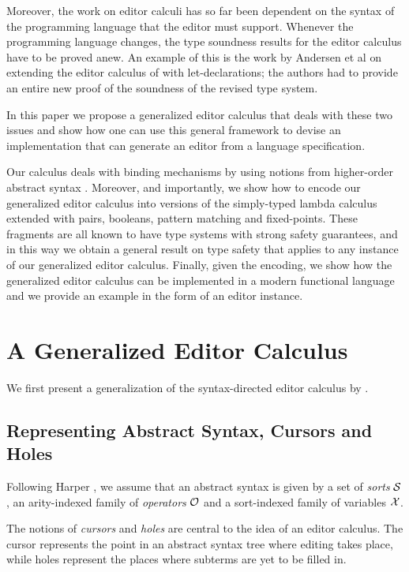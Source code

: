 \documentclass[sigplan,screen]{acmart}
\begin{document}
Moreover, the work on editor calculi has so far been dependent on the
syntax of the programming language that the editor must
support. Whenever the programming language changes, the type soundness
results for the editor calculus have to be proved anew. An example of
this is the work by Andersen et al \cite{10.1145/3587216.3587221} on
extending the editor calculus of \cite{type_safe_structure_editor}
with let-declarations; the authors had to provide an entire new proof
of the soundness of the revised type system.

In this paper we propose a generalized editor calculus that deals with
these two issues and show how one can use this general framework to
devise an implementation that can generate an editor from a language
specification.

Our calculus deals with binding mechanisms by using notions from
higher-order abstract syntax \cite{hoas}. Moreover, and importantly,
we show how to encode our generalized editor calculus into versions of
the simply-typed lambda calculus extended with pairs, booleans,
pattern matching and fixed-points. These fragments are all known to
have type systems with strong safety guarantees, and in this way we
obtain a general result on type safety that applies to any instance of
our generalized editor calculus. Finally, given the encoding, we show
how the generalized editor calculus can be implemented in a modern
functional language and we provide an example in the form of an editor 
instance.

\section{A Generalized Editor Calculus}\label{sec:general_editor}

We first present a generalization of the syntax-directed editor
calculus by \cite{type_safe_structure_editor}.

\subsection{Representing Abstract Syntax, Cursors and Holes}

Following Harper \cite{harper_foundations}, we assume that an abstract
syntax is given by a set of \emph{sorts} $\mathcal{S}$, an arity-indexed
family of \emph{operators} $\mathcal{O}$ and a sort-indexed family of
variables $\mathcal{X}$.

The notions of \emph{cursors} and \emph{holes} are central to the idea
of an editor calculus. The cursor represents the point in an abstract
syntax tree where editing takes place, while holes represent the
places where subterms are yet to be filled in.
\end{document}
